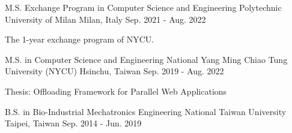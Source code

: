 

\begin{cventries}

  \cventry
    {M.S. Exchange Program in Computer Science and Engineering} %
    {Polytechnic University of Milan} %
    {Milan, Italy} %
    {Sep. 2021 - Aug. 2022} %
    {
      \begin{cvitems} %
        \item {The 1-year exchange program of NYCU.}
      \end{cvitems}
    }

  \cventry
    {M.S. in Computer Science and Engineering} %
    {National Yang Ming Chiao Tung University (NYCU)} %
    {Hsinchu, Taiwan} %
    {Sep. 2019 - Aug. 2022} %
    {
      \begin{cvitems} %
        \item {Thesis: Offloading Framework for Parallel Web Applications}
      \end{cvitems}
    }

  \cventry
    {B.S. in Bio-Industrial Mechatronics Engineering} %
    {National Taiwan University} %
    {Taipei, Taiwan} %
    {Sep. 2014 - Jun. 2019} %
    {
      \begin{cvitems} %
      \end{cvitems}
    }

\end{cventries}
